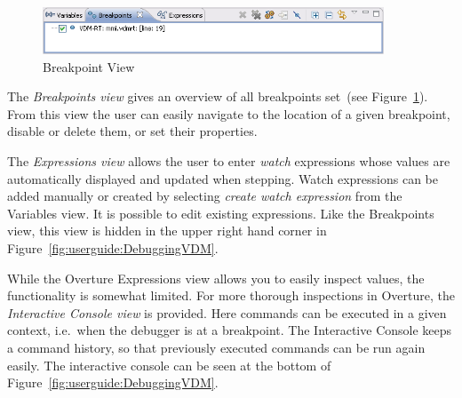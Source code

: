 \begin{figure}[htp]
\begin{center}
  \includegraphics[width=4in]{figures/BreakpointViewRT}
  \caption{Breakpoint View}
  \label{fig:userguide:BreakpointView}
\end{center}
\end{figure}

The \emph{Breakpoints view} gives an overview of all breakpoints
set~(see Figure~\ref{fig:userguide:BreakpointView}). From this view
the user can easily navigate to the location of a given breakpoint,
disable or delete them, or set their properties.
 



The \emph{Expressions view} allows the user to enter \emph{watch}
expressions whose values are automatically displayed and updated when
stepping. Watch expressions can be added manually or created by
selecting \emph{create watch expression} from the Variables view. It
is possible to edit existing expressions.  Like the Breakpoints view,
this view is hidden in the upper right hand corner in
Figure~\ref{fig:userguide:DebuggingVDM}.

While the Overture Expressions view allows you to easily inspect
values, the functionality is somewhat limited. For more thorough
inspections in Overture, the \emph{Interactive Console view} is
provided. Here commands can be executed in a given context, i.e.\ when
the debugger is at a breakpoint. The Interactive Console keeps a
command history, so that previously executed commands can be run again
easily. The interactive console can be seen at the bottom of
Figure~\ref{fig:userguide:DebuggingVDM}.

